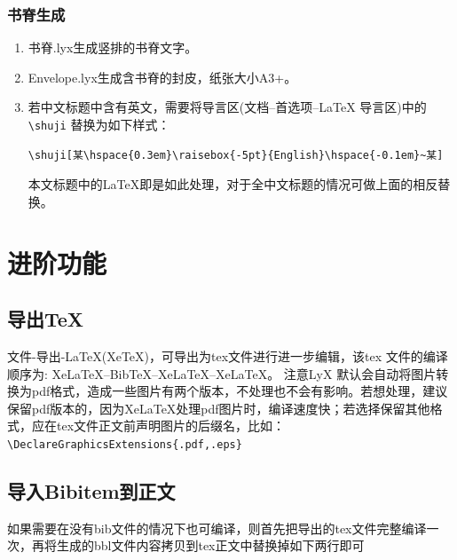 \documentclass[twoside,longtitle]{LZUthesis}
\begin{document}
\subsection{书脊生成}
\begin{enumerate}
\item 书脊.lyx生成竖排的书脊文字。
\item Envelope.lyx生成含书脊的封皮，纸张大小A3+。
\item 若中文标题中含有英文，需要将导言区(文档--首选项--\LaTeX{} 导言区)中的\lstinline!\shuji! 替换为如下样式：\footnotesize
\begin{lstlisting}
\shuji[某\hspace{0.3em}\raisebox{-5pt}{English}\hspace{-0.1em}~某]
\end{lstlisting}
\normalsize 本文标题中的\LaTeX{}即是如此处理，对于全中文标题的情况可做上面的相反替换。
\end{enumerate}

\chapter{进阶功能}


\section{导出\protect\TeX{}\label{sec:export}}

文件-导出-\LaTeX{}(Xe\TeX{})，可导出为tex文件进行进一步编辑，该tex 文件的编译顺序为: Xe\LaTeX{}--Bib\TeX{}--Xe\LaTeX{}--Xe\LaTeX{}。 注意LyX 默认会自动将图片转换为pdf格式，造成一些图片有两个版本，不处理也不会有影响。若想处理，建议保留pdf版本的，因为Xe\LaTeX{}处理pdf图片时，编译速度快；若选择保留其他格式，应在tex文件正文前声明图片的后缀名，比如：\lstinline!\DeclareGraphicsExtensions{.pdf,.eps}!


\section{导入Bibitem到正文}

如果需要在没有bib文件的情况下也可编译，则首先把导出的tex文件完整编译一次，再将生成的bbl文件内容拷贝到tex正文中替换掉如下两行即可

\end{document}
